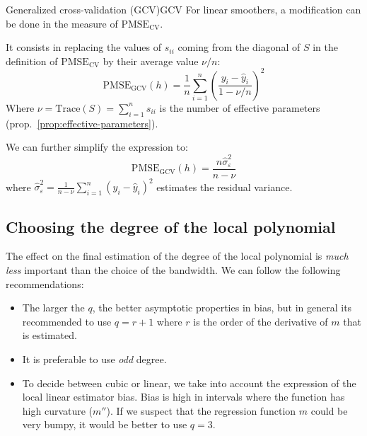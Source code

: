 \begin{definition}{Generalized cross-validation (GCV)}{GCV}
	For linear smoothers, a modification can be done in the measure
	of $\text{PMSE}_\text{CV}$.

	It consists in replacing the values of $s_{ii}$ coming
	from the diagonal of $S$ in the definition of
	$\text{PMSE}_\text{CV}$ by their average value $\nu/n$:
	\begin{equation*}
		\text{PMSE}_\text{GCV}(h) = \frac{1}{n} \sum_{i=1}^n \left(
		\frac{y_i - \hat y_i}{1 - \nu/n}
		\right)^2
	\end{equation*}
	Where $\nu = \text{Trace}(S) = \sum_{i=1}^n s_{ii}$ is the number of effective
	parameters (prop.~\ref{prop:effective-parameters}).

	We can further simplify the expression to:
	\begin{equation*}
		\boxed{
			\text{PMSE}_\text{GCV}(h) = \frac{n\hat\sigma_\varepsilon^2}{n - \nu}
		}
	\end{equation*}
	where $\hat\sigma_\varepsilon^2 = \frac{1}{n-\nu}\sum^n_{i=1}\left(y_i - \hat y_i\right)^2$
	estimates the residual variance.
\end{definition}

\subsection{Choosing the degree of the local polynomial}
The effect on the final estimation of the degree of the
local polynomial is \emph{much less} important
than the choice of the bandwidth. We can follow the following
recommendations:
\begin{itemize}
	\item The larger the $q$, the better asymptotic properties in bias,
	      but in general its recommended to use $q = r+1$ where $r$ is the
	      order of the derivative of $m$ that is estimated.
	\item It is preferable to use \emph{odd} degree.
	\item To decide between cubic or linear, we take into account the
	      expression of the local linear estimator bias. Bias is high
	      in intervals where the function has high curvature ($m''$).
	      If we suspect that the regression function $m$ could be very
	      bumpy, it would be better to use $q=3$.
\end{itemize}
